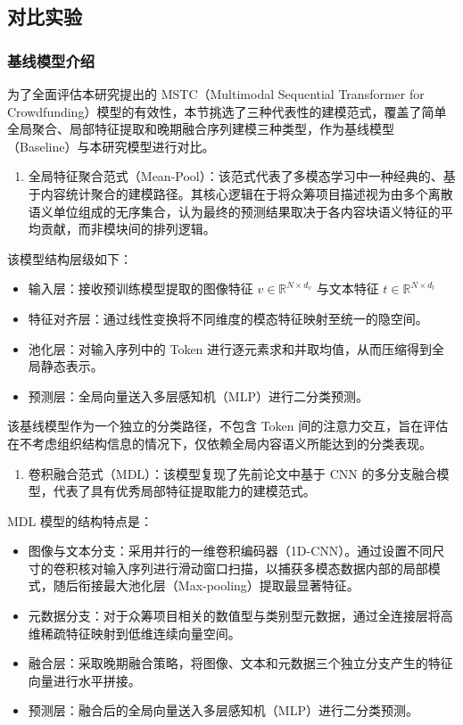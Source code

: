 \subsection{对比实验}

\subsubsection{基线模型介绍}

为了全面评估本研究提出的 MSTC（Multimodal Sequential Transformer for Crowdfunding）模型的有效性，本节挑选了三种代表性的建模范式，覆盖了简单全局聚合、局部特征提取和晚期融合序列建模三种类型，作为基线模型（Baseline）与本研究模型进行对比。

\begin{enumerate}
\def\labelenumi{(\arabic{enumi})}
\item
  全局特征聚合范式（Mean-Pool）：该范式代表了多模态学习中一种经典的、基于内容统计聚合的建模路径。其核心逻辑在于将众筹项目描述视为由多个离散语义单位组成的无序集合，认为最终的预测结果取决于各内容块语义特征的平均贡献，而非模块间的排列逻辑。
\end{enumerate}

该模型结构层级如下：

\begin{itemize}
\item
  输入层：接收预训练模型提取的图像特征 $ v \in \mathbb{R}^{N \times d_v} $ 与文本特征 $ t \in \mathbb{R}^{N \times d_t} $
\item
  特征对齐层：通过线性变换将不同维度的模态特征映射至统一的隐空间。
\item
  池化层：对输入序列中的 Token 进行逐元素求和并取均值，从而压缩得到全局静态表示。
\item
  预测层：全局向量送入多层感知机（MLP）进行二分类预测。
\end{itemize}

该基线模型作为一个独立的分类路径，不包含 Token 间的注意力交互，旨在评估在不考虑组织结构信息的情况下，仅依赖全局内容语义所能达到的分类表现。

\begin{enumerate}
\def\labelenumi{(\arabic{enumi})}
\setcounter{enumi}{1}
\item
  卷积融合范式（MDL）：该模型复现了先前论文中基于 CNN 的多分支融合模型，代表了具有优秀局部特征提取能力的建模范式。
\end{enumerate}

MDL 模型的结构特点是：

\begin{itemize}
\item
  图像与文本分支：采用并行的一维卷积编码器（1D-CNN）。通过设置不同尺寸的卷积核对输入序列进行滑动窗口扫描，以捕获多模态数据内部的局部模式，随后衔接最大池化层（Max-pooling）提取最显著特征。
\item
  元数据分支：对于众筹项目相关的数值型与类别型元数据，通过全连接层将高维稀疏特征映射到低维连续向量空间。
\item
  融合层：采取晚期融合策略，将图像、文本和元数据三个独立分支产生的特征向量进行水平拼接。
\item
  预测层：融合后的全局向量送入多层感知机（MLP）进行二分类预测。
\end{itemize}

